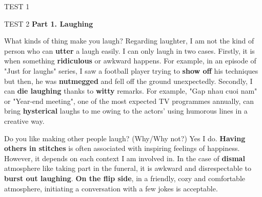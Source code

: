\begin{glossarymc}[Cambridge 7]
\begin{test}{TEST 1}
\begin{VocabHighlights}
    \end{VocabHighlights}
    \end{test}

    \begin{test}{TEST 2}
    \noindent
    \textbf{Part 1. Laughing}
    \begin{qa}{What kinds of thing make you laugh?}
    Regarding laughter, I am not the kind of person who can \textbf{utter} a laugh easily. I can only laugh in two cases. Firstly, it is when something \textbf{ridiculous} or awkward happens. For example, in an episode of "Just for laughs" series, I saw a football player trying to \textbf{show off} his techniques but then, he was \textbf{nutmegged} and fell off the ground unexpectedly. Secondly, I can \textbf{die laughing} thanks to \textbf{witty} remarks. For example, "Gap nhau cuoi nam" or "Year-end meeting", one of the most expected TV programmes annually, can bring \textbf{hysterical} laughs to me owing to the actors' using humorous lines in a creative way.
    \end{qa}

    \begin{qa}{Do you like making other people laugh? (Why/Why not?)}
    Yes I do. \textbf{Having others in stitches} is often associated with inspiring feelings of happiness. However, it depends on each context I am involved in. In the case of \textbf{dismal} atmosphere like taking part in the funeral, it is awkward and disrespectable to \textbf{burst out laughing}. \textbf{On the flip side}, in a friendly, cozy and comfortable atmosphere, initiating a conversation with a few jokes is acceptable.
    \end{qa}


\end{test}
\end{glossarymc}
